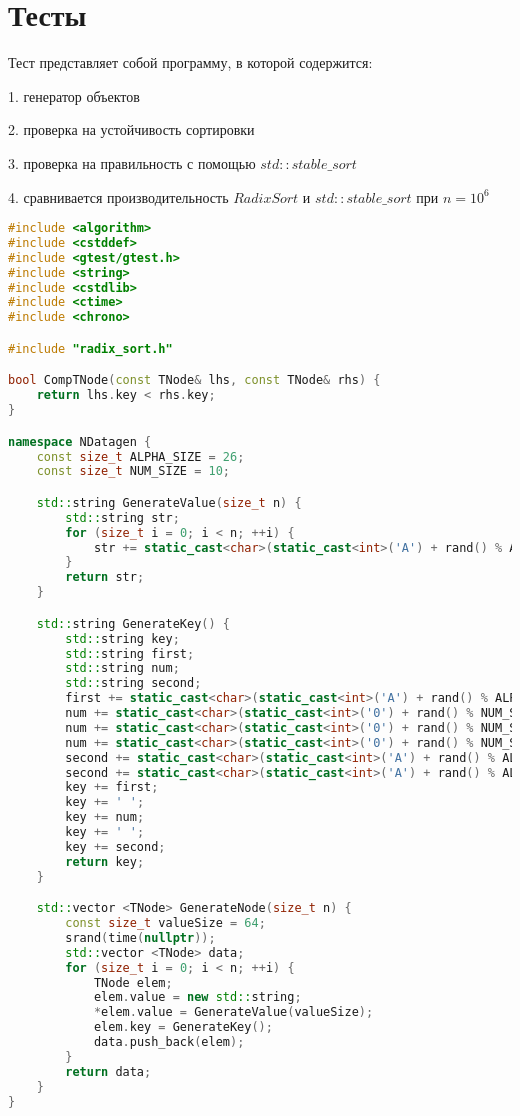 \section{Тесты}

Тест представляет собой программу, в которой содержится:

1. генератор объектов

2. проверка на устойчивость сортировки

3. проверка на правильность с помощью $std::stable\_sort$

4. сравнивается производительность $Radix Sort$ и $std::stable\_sort$ при $n = 10^6$

\begin{lstlisting}[language=C++]
#include <algorithm>
#include <cstddef>
#include <gtest/gtest.h>
#include <string>
#include <cstdlib>
#include <ctime>
#include <chrono>

#include "radix_sort.h"

bool CompTNode(const TNode& lhs, const TNode& rhs) {
    return lhs.key < rhs.key;
}

namespace NDatagen {
    const size_t ALPHA_SIZE = 26;
    const size_t NUM_SIZE = 10;

    std::string GenerateValue(size_t n) {
        std::string str;
        for (size_t i = 0; i < n; ++i) {
            str += static_cast<char>(static_cast<int>('A') + rand() % ALPHA_SIZE);
        }
        return str;
    }

    std::string GenerateKey() {
        std::string key;
        std::string first;
        std::string num;
        std::string second;
        first += static_cast<char>(static_cast<int>('A') + rand() % ALPHA_SIZE);
        num += static_cast<char>(static_cast<int>('0') + rand() % NUM_SIZE);
        num += static_cast<char>(static_cast<int>('0') + rand() % NUM_SIZE);
        num += static_cast<char>(static_cast<int>('0') + rand() % NUM_SIZE);
        second += static_cast<char>(static_cast<int>('A') + rand() % ALPHA_SIZE);
        second += static_cast<char>(static_cast<int>('A') + rand() % ALPHA_SIZE);
        key += first;
        key += ' ';
        key += num;
        key += ' ';
        key += second;
        return key;
    }

    std::vector <TNode> GenerateNode(size_t n) {
        const size_t valueSize = 64;
        srand(time(nullptr));
        std::vector <TNode> data;
        for (size_t i = 0; i < n; ++i) {
            TNode elem;
            elem.value = new std::string;
            *elem.value = GenerateValue(valueSize);
            elem.key = GenerateKey();
            data.push_back(elem);
        }
        return data;
    }
}


\end{lstlisting}
